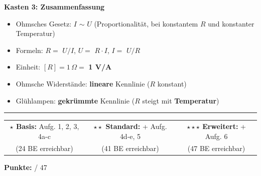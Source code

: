 \documentclass[11pt, a4paper]{article}
\newcommand{\maxpunkte}{47}
\newcommand{\luecke}[1]{\underline{\hspace{#1}}}
\newcommand{\loes}[1]{\textcolor{loesung}{\textbf{#1}}}
\begin{document}

\vspace{0.3em}
\begin{merkkasten}
\textbf{Kasten 3: Zusammenfassung}

\vspace{0.3em}
\begin{itemize}[leftmargin=1.5em, itemsep=2pt]
    \item Ohmsches Gesetz: \loes{$I$} $\sim$ \loes{$U$} (Proportionalität, bei konstantem $R$ und konstanter Temperatur)
    \item Formeln: $R =$ \loes{$U/I$}, \hspace{0.2cm} $U =$ \loes{$R \cdot I$}, \hspace{0.2cm} $I =$ \loes{$U/R$}
    \item Einheit: $[R] = 1\,\Omega = $ \loes{1 V/A}
    \item Ohmsche Widerstände: \loes{lineare} Kennlinie ($R$ konstant)
    \item Glühlampen: \loes{gekrümmte} Kennlinie ($R$ steigt mit \loes{Temperatur})
\end{itemize}
\end{merkkasten}


\vspace{0.8em}
\hrule
\vspace{0.5em}

\begin{center}
\small
\begin{tabular}{ccc}
\textbf{$\star$ Basis:} Aufg. 1, 2, 3, 4a-c & \textbf{$\star\star$ Standard:} + Aufg. 4d-e, 5 & \textbf{$\star\star\star$ Erweitert:} + Aufg. 6 \\
(24 BE erreichbar) & (41 BE erreichbar) & (47 BE erreichbar)
\end{tabular}
\end{center}

\vspace{0.3em}
\hfill\textbf{Punkte:} \luecke{1.5cm} / \maxpunkte
\end{document}
